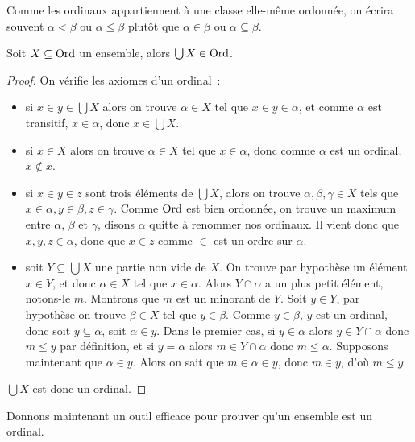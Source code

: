 \begin{notation}
  Comme les ordinaux appartiennent à une classe elle-même ordonnée, on écrira
  souvent $\alpha < \beta$ ou $\alpha \leq \beta$ plutôt que $\alpha \in \beta$
  ou $\alpha \subseteq \beta$.
\end{notation}

\begin{property}
  Soit $X\subseteq\operatorname{Ord}$ un ensemble, alors $\bigcup X \in \operatorname{Ord}$.
\end{property}

\begin{proof}
  On vérifie les axiomes d'un ordinal~:
  \begin{itemize}
  \item si $x\in y\in \bigcup X$ alors on trouve $\alpha \in X$ tel que
    $x\in y \in \alpha$, et comme $\alpha$ est transitif, $x\in \alpha$, donc
    $x\in \bigcup X$.
  \item si $x\in X$ alors on trouve $\alpha \in X$ tel que $x\in \alpha$, donc
    comme $\alpha$ est un ordinal, $x\notin x$.
  \item si $x\in y\in z$ sont trois éléments de $\bigcup X$, alors on trouve
    $\alpha,\beta,\gamma\in X$ tels que $x\in \alpha,y\in \beta,z\in\gamma$.
    Comme $\operatorname{Ord}$ est bien ordonnée, on trouve un maximum entre $\alpha$,
    $\beta$ et $\gamma$, disons $\alpha$ quitte à renommer nos ordinaux.
    Il vient donc que $x,y,z\in\alpha$, donc que $x\in z$ comme $\in$
    est un ordre sur $\alpha$.
  \item soit $Y\subseteq \bigcup X$ une partie non vide de $X$. On trouve par
    hypothèse un élément $x\in Y$, et donc $\alpha \in X$ tel que $x\in\alpha$.
    Alors $Y\cap \alpha$ a un plus petit élément, notons-le $m$. Montrons que
    $m$ est un minorant de $Y$. Soit $y\in Y$, par hypothèse on trouve
    $\beta\in X$ tel que $y\in \beta$. Comme $y\in \beta$, $y$ est un ordinal,
    donc soit $y\subseteq \alpha$, soit $\alpha \in y$. Dans le premier cas,
    si $y\in \alpha$ alors $y\in Y \cap \alpha$ donc $m \leq y$ par définition,
    et si $y=\alpha$ alors $m\in Y \cap \alpha$ donc $m \leq \alpha$.
    Supposons maintenant que $\alpha \in y$. Alors on sait que
    $m\in \alpha\in y$, donc $m\in y$, d'où $m\leq y$.
  \end{itemize}

  $\bigcup X$ est donc un ordinal.
\end{proof}

Donnons maintenant un outil efficace pour prouver qu'un ensemble est un ordinal.

